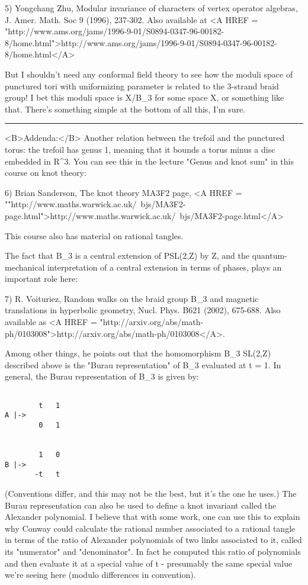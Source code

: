 5) Yongchang Zhu, Modular invariance of characters of vertex operator algebras,
J. Amer. Math. Soc 9 (1996), 237-302.  Also available at
<A HREF = "http://www.ams.org/jams/1996-9-01/S0894-0347-96-00182-8/home.html">http://www.ams.org/jams/1996-9-01/S0894-0347-96-00182-8/home.html</A>


But I shouldn't need any conformal field theory to see how the moduli
space of punctured tori with uniformizing parameter is related to the
3-strand braid group!  I bet this moduli space is X/B_{3} for
some space X, or something like that.  There's something simple at the
bottom of all this, I'm sure.

\par\noindent\rule{\textwidth}{0.4pt}
<B>Addenda:</B>  Another relation between the trefoil and
the punctured torus: the trefoil has genus 1, meaning that
it bounds a torus minus a disc embedded in R^{3}.
You can see this in the lecture "Genus and knot sum" in 
this course on knot theory:

6) Brian Sanderson, The knot theory MA3F2 page, 
<A HREF = ""http://www.maths.warwick.ac.uk/~bjs/MA3F2-page.html">http://www.maths.warwick.ac.uk/~bjs/MA3F2-page.html</A>

This course also has material on rational tangles.

The fact that B_{3} is a central extension of
PSL(2,Z) by Z, and the quantum-mechanical interpretation of
a central extension in terms of phases, plays an important role
here:


7) R. Voituriez, Random walks on the braid group B_{3} 
and magnetic translations in hyperbolic geometry, Nucl. Phys. B621 
(2002), 675-688.  Also available as 
<A HREF = "http://arxiv.org/abs/math-ph/0103008">http://arxiv.org/abs/math-ph/0103008</A>.

Among other things, he points out that the homomorphism
B_{3} \to  SL(2,Z) described above is the "Burau
representation" of B_{3} evaluated at t = 1.
In general, the Burau representation of B_{3} is given 
by:


\begin{verbatim}

        t   1
A |->  
        0   1


        1   0
B |->  
       -t   t
\end{verbatim}
    
(Conventions differ, and this may not be the best, but it's
the one he uses.)  The Burau representation can also be used
to define a knot invariant called the Alexander polynomial.  
I believe that with some work, one can use this to explain
why Conway could calculate the rational number associated to a
rational tangle in terms of the ratio of Alexander polynomials of two
links associated to it, called its "numerator" and
"denominator".  In fact he computed this ratio of
polynomials and then evaluate it at a special value of t - 
presumably the same special value we're seeing here (modulo
differences in convention).

